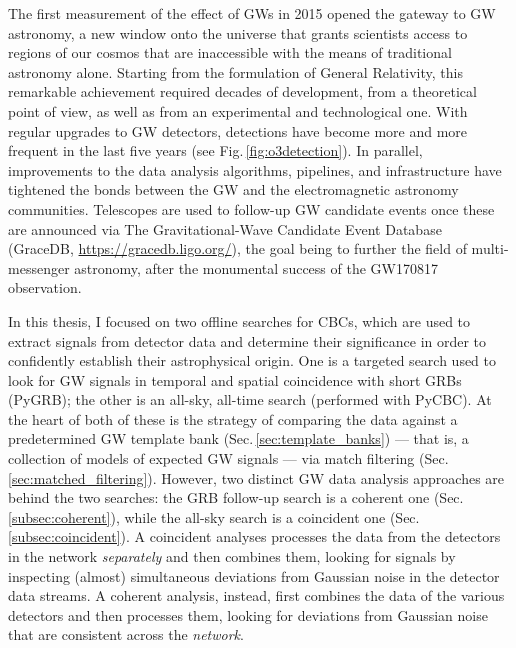 \documentclass[binding=0.6cm, LaM]{sapthesis}
\begin{document}
	The first measurement of the effect of GWs in 2015 opened the gateway to GW astronomy, 
	a new window onto the universe that grants scientists access to regions of our cosmos 
	that are inaccessible with the means of traditional astronomy alone.
	Starting from the formulation of General Relativity, this remarkable achievement 
	required decades of development, from a theoretical point of view, as well as from 
	an experimental and technological one.
	With regular upgrades to GW detectors, detections have become more and more frequent 
	in the last five years (see Fig.\,\ref{fig:o3detection}).  
	In parallel, improvements to the data analysis algorithms, 
	pipelines, and infrastructure have tightened the bonds between the GW and the electromagnetic astronomy communities.  
	Telescopes are used to follow-up GW candidate events once these are announced via 
	The Gravitational-Wave Candidate Event Database ({\ttfamily GraceDB}, \url{https://gracedb.ligo.org/}), 
	the goal being to further the field of multi-messenger astronomy, 
	after the monumental success of the GW170817 observation.

	In this thesis, I focused on two offline searches for CBCs,
	which are used to extract signals from detector data and determine their significance 
	in order to confidently establish their astrophysical origin.
        One is a targeted search used to look for GW signals in temporal and spatial coincidence with short GRBs ({\ttfamily PyGRB}); 
	the other is an all-sky, all-time search (performed with {\ttfamily PyCBC}).
        At the heart of both of these is the strategy of comparing the data against a predetermined GW template bank (Sec.\,\ref{sec:template_banks}) 
	--- that is, a collection of models of expected GW signals --- 
	via match filtering (Sec.\,\ref{sec:matched_filtering}).  
	However, two distinct GW data analysis approaches are behind the two searches: 
	the GRB follow-up search is a coherent one (Sec.\,\ref{subsec:coherent}), 
	while the all-sky search is a coincident one (Sec.\,\ref{subsec:coincident}).
        A coincident analyses processes the data from the detectors in the network \emph{separately} 
	and then combines them, looking for signals by inspecting (almost) simultaneous deviations 
	from Gaussian noise in the detector data streams.
        A coherent analysis, instead, first combines the data of the various detectors and 
	then processes them, looking for deviations from Gaussian noise that are consistent across the \emph{network}.
\end{document}
